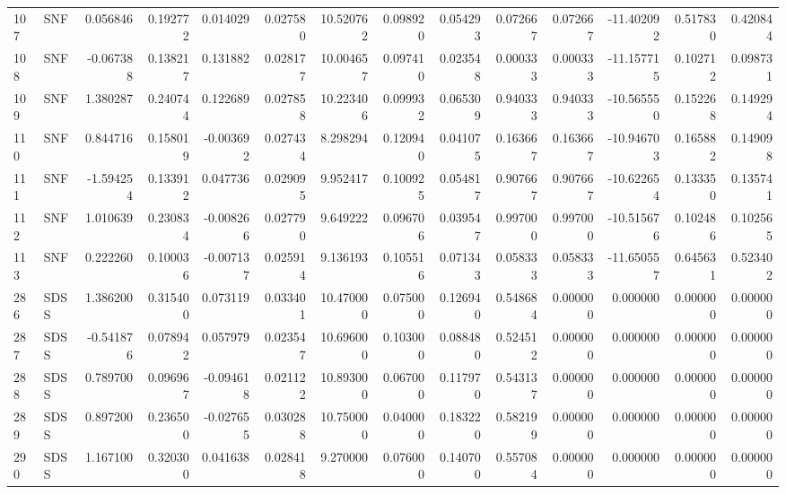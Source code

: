 \begin{tabular}{llrrrrrrrrrrrr}
107 &    SNF &  0.056846 &      0.192772 &  0.014029 &    0.027580 &  10.520762 &      0.098920 &   0.054293 &  0.072667 &  0.072667 & -11.402092 &     0.517830 &     0.420844 \\
108 &    SNF & -0.067388 &      0.138217 &  0.131882 &    0.028177 &  10.004657 &      0.097410 &   0.023548 &  0.000333 &  0.000333 & -11.157715 &     0.102712 &     0.098731 \\
109 &    SNF &  1.380287 &      0.240744 &  0.122689 &    0.027858 &  10.223406 &      0.099932 &   0.065309 &  0.940333 &  0.940333 & -10.565550 &     0.152268 &     0.149294 \\
110 &    SNF &  0.844716 &      0.158019 & -0.003692 &    0.027434 &   8.298294 &      0.120940 &   0.041075 &  0.163667 &  0.163667 & -10.946703 &     0.165882 &     0.149098 \\
111 &    SNF & -1.594254 &      0.133912 &  0.047736 &    0.029095 &   9.952417 &      0.100925 &   0.054817 &  0.907667 &  0.907667 & -10.622654 &     0.133350 &     0.135741 \\
112 &    SNF &  1.010639 &      0.230834 & -0.008266 &    0.027790 &   9.649222 &      0.096706 &   0.039547 &  0.997000 &  0.997000 & -10.515676 &     0.102486 &     0.102565 \\
113 &    SNF &  0.222260 &      0.100036 & -0.007137 &    0.025914 &   9.136193 &      0.105516 &   0.071343 &  0.058333 &  0.058333 & -11.650557 &     0.645631 &     0.523402 \\
286 &   SDSS &  1.386200 &      0.315400 &  0.073119 &    0.033401 &  10.470000 &      0.075000 &   0.126940 &  0.548684 &  0.000000 &   0.000000 &     0.000000 &     0.000000 \\
287 &   SDSS & -0.541876 &      0.078942 &  0.057979 &    0.023547 &  10.696000 &      0.103000 &   0.088480 &  0.524512 &  0.000000 &   0.000000 &     0.000000 &     0.000000 \\
288 &   SDSS &  0.789700 &      0.096967 & -0.094618 &    0.021122 &  10.893000 &      0.067000 &   0.117970 &  0.543137 &  0.000000 &   0.000000 &     0.000000 &     0.000000 \\
289 &   SDSS &  0.897200 &      0.236500 & -0.027655 &    0.030288 &  10.750000 &      0.040000 &   0.183220 &  0.582199 &  0.000000 &   0.000000 &     0.000000 &     0.000000 \\
290 &   SDSS &  1.167100 &      0.320300 &  0.041638 &    0.028418 &   9.270000 &      0.076000 &   0.140700 &  0.557084 &  0.000000 &   0.000000 &     0.000000 &     0.000000 \\

\end{tabular}
